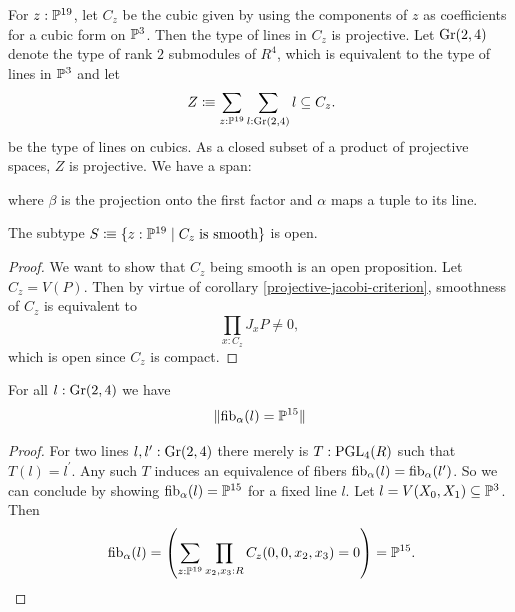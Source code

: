 

For $z:\mathbb{P}^{19}$, let $C_z$ be the cubic given by using the components of $z$ as coefficients for a cubic form on $\mathbb{P}^3$.
Then the type of lines in $C_z$ is projective. Let $\mathrm{Gr}(2,4)$ denote the type of rank \(2\) submodules of \(R^4\), which is equivalent to the type of lines in $\mathbb{P}^3$ and
let \[Z\colonequiv\sum_{z:\bP^{19}}\sum_{l:\Gr(2,4)}l\subseteq C_z\rlap{.} \]
be the type of lines on cubics. As a closed subset of a product of projective spaces, \(Z\) is projective.
We have a span:
\begin{center}
\end{center}
where $\beta$ is the projection onto the first factor and $\alpha$ maps a tuple to its line.

\begin{lemma}
  \label{smooth-cubics-open}
  The subtype $S\vcentcolon\mspace{-1.2mu}\equiv \{ z:\mathbb{P}^{19} \;|\; C_z \;\text{is smooth} \}$ is open.
\end{lemma}

\begin{proof}
  We want to show that $C_z$ being smooth is an open proposition.
  Let $C_z = V(P)$. Then by virtue of corollary \ref{projective-jacobi-criterion}, smoothness of $C_z$ is equivalent to
  \[
    \prod_{x:C_z} J_xP \neq 0,
  \]
  which is open since $C_z$ is compact.
\end{proof}

\begin{lemma}
  \label{p15-bundle}
  For all \(l:\mathrm{Gr}(2,4)\) we have
  \[
  \|\mathrm{fib}_\alpha(l)=\mathbb{P}^{15}\|
  \]
\end{lemma}

\begin{proof}
For two lines \(l,l^\prime:\mathrm{Gr}(2,4)\) there merely is \(T:\operatorname{PGL}_{4}(R)\) such that \(T(l)=l^\prime\).
Any such \(T\) induces an equivalence of fibers \(\mathrm{fib}_\alpha(l)=\mathrm{fib}_\alpha(l^\prime)\).
So we can conclude by showing \(\mathrm{fib}_\alpha(l)=\mathbb{P}^{15}\) for a fixed line \(l\).
Let \(l=V(X_0,X_1)\subseteq\mathbb{P}^3\). Then \[\fib_\alpha(l)=\left(\sum_{z:\bP^{19}}\prod_{x_2,x_3:R}C_z(0,0,x_2,x_3)=0\right)=\bP^{15}\rlap{.}\]
\end{proof}

